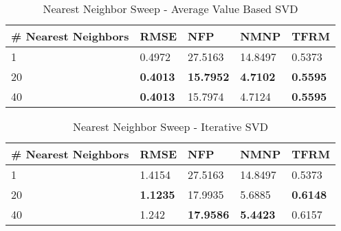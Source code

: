 \begin{table}[]
\centering
\caption{Nearest Neighbor Sweep - Average Value Based SVD}
\label{tab:nnaverage}
\begin{tabular}{|l|l|l|l|l|}
\hline
\# Nearest Neighbors & RMSE   & NFP     & NMNP    & TFRM   \\ \hline
1                    & 0.4972 & 27.5163 & 14.8497 & 0.5373 \\ \hline
20                   & \textbf{0.4013} & \textbf{15.7952} & \textbf{4.7102}  & \textbf{0.5595} \\ \hline
40                   & \textbf{0.4013} & 15.7974 & 4.7124  & \textbf{0.5595} \\ \hline
\end{tabular}
\end{table}

\begin{table}[]
\centering
\caption{Nearest Neighbor Sweep - Iterative SVD}
\label{tab:nniterative}
\begin{tabular}{|l|l|l|l|l|}
\hline
\# Nearest Neighbors & RMSE   & NFP     & NMNP    & TFRM   \\ \hline
1                    & 1.4154 & 27.5163 & 14.8497 & 0.5373 \\ \hline
20                   & \textbf{1.1235} & 17.9935 & 5.6885  & \textbf{0.6148} \\ \hline
40                   & 1.242  & \textbf{17.9586} & \textbf{5.4423}  & 0.6157 \\ \hline
\end{tabular}
\end{table}


